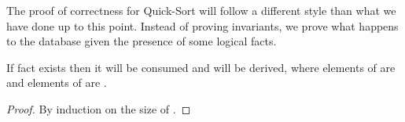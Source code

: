 The proof of correctness for Quick-Sort will follow a different style than what
we have done up to this point. Instead of proving invariants, we prove what
happens to the database given the presence of some logical facts.

\begin{lemma}

If fact  exists then it will be
consumed and  will
be derived, where elements of  are \code{<=}  and
elements of  are .

\end{lemma}
\begin{proof}
By induction on the size of .
\end{proof}

